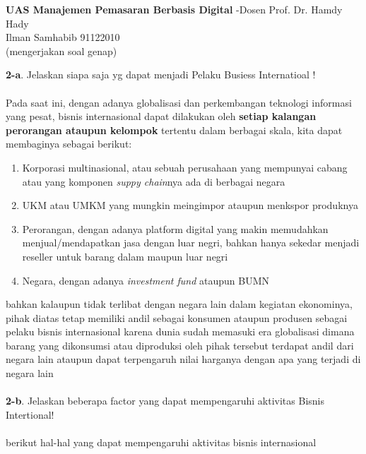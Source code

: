 \documentclass{article}
\begin{document}
\begin{center}
    \textbf{UAS Manajemen Pemasaran Berbasis Digital} -Dosen Prof. Dr. Hamdy Hady\\
    Ilman Samhabib 91122010\\
    (mengerjakan soal genap)\\   
\end{center}
 
\noindent \textbf{2-a}. Jelaskan siapa saja yg dapat menjadi Pelaku Busiess Internatioal !\\\\
Pada saat ini, dengan adanya globalisasi dan perkembangan teknologi informasi yang pesat,  bisnis internasional dapat dilakukan oleh \textbf{setiap kalangan 
perorangan ataupun kelompok} tertentu dalam berbagai skala, kita dapat membaginya sebagai berikut:
\begin{enumerate}
    \item Korporasi multinasional, atau sebuah perusahaan yang mempunyai cabang atau yang komponen \emph{suppy chain}nya ada di berbagai negara
    \item UKM atau UMKM yang mungkin meingimpor ataupun menkspor produknya
    \item Perorangan, dengan adanya platform digital yang makin memudahkan menjual/mendapatkan jasa dengan luar negri, bahkan hanya sekedar menjadi reseller untuk barang dalam maupun luar negri
    \item Negara, dengan adanya \emph{investment fund} ataupun BUMN
\end{enumerate}
bahkan kalaupun tidak terlibat dengan negara lain dalam kegiatan ekonominya,
pihak diatas tetap memiliki andil sebagai konsumen ataupun produsen sebagai pelaku bisnis 
internasional karena dunia sudah memasuki era globalisasi 
dimana barang yang dikonsumsi atau diproduksi oleh pihak tersebut terdapat andil dari negara lain ataupun dapat 
terpengaruh nilai harganya dengan apa yang terjadi di negara lain\\\\
\textbf{2-b}. Jelaskan beberapa factor yang dapat mempengaruhi aktivitas Bisnis Intertional!\\
\\berikut hal-hal yang dapat mempengaruhi aktivitas bisnis internasional
\end{document}
